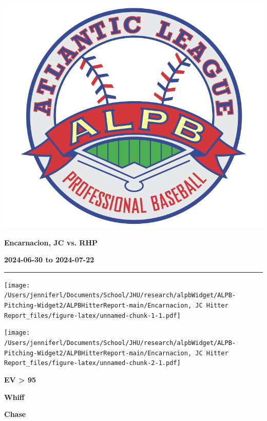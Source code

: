 \documentclass[
]{article}
\author{}
\date{\vspace{-2.5em}2025-02-16}
\begin{document}
\begin{multicols}{3} %

\includegraphics[width=0.4\columnwidth]{ALPB_Logo} %

\hspace{0pt}
\vfill
\hspace{-0.5in}\large\textbf{Encarnacion, JC vs. RHP} %
\vfill
\hspace{0pt}

\hspace{0pt}
\vfill
\large\textbf{2024-06-30 to 2024-07-22} %
\vfill
\hspace{0pt}

\end{multicols}
\vspace{-0.35in}

\noindent

\rule{\textwidth}{0.75pt}

\texttt{[image: /Users/jenniferl/Documents/School/JHU/research/alpbWidget/ALPB-Pitching-Widget2/ALPBHitterReport-main/Encarnacion, JC Hitter Report\_files/figure-latex/unnamed-chunk-1-1.pdf]}

\texttt{[image: /Users/jenniferl/Documents/School/JHU/research/alpbWidget/ALPB-Pitching-Widget2/ALPBHitterReport-main/Encarnacion, JC Hitter Report\_files/figure-latex/unnamed-chunk-2-1.pdf]}

\begin{multicols}{3} %



\hspace{0.2in}\centerline{\LARGE\textbf{EV > 95}}



\hspace{-0.05in}\centerline{\LARGE\textbf{Whiff}}



\hspace{-0.05in}\centerline{\LARGE\textbf{Chase}}
\end{multicols}
\end{document}
